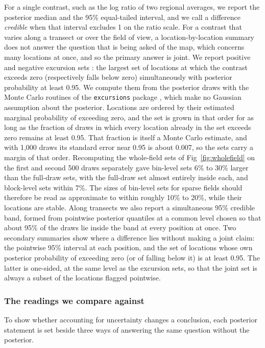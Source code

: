 \documentclass[10pt,letterpaper]{article}
\begin{document}
For a single contrast, such as the log ratio of two regional averages, we report the posterior median and the 95\% equal-tailed interval, and we call a difference \textit{credible} when that interval excludes 1 on the ratio scale. For a contrast that varies along a transect or over the field of view, a location-by-location summary does not answer the question that is being asked of the map, which concerns many locations at once, and so the primary answer is joint. We report positive and negative excursion sets \cite{bolin2015excursion}: the largest set of locations at which the contrast exceeds zero (respectively falls below zero) simultaneously with posterior probability at least 0.95. We compute them from the posterior draws with the Monte Carlo routines of the \texttt{excursions} package \cite{bolin2018excursions}, which make no Gaussian assumption about the posterior. Locations are ordered by their estimated marginal probability of exceeding zero, and the set is grown in that order for as long as the fraction of draws in which every location already in the set exceeds zero remains at least 0.95. That fraction is itself a Monte Carlo estimate, and with 1,000 draws its standard error near 0.95 is about 0.007, so the sets carry a margin of that order. Recomputing the whole-field sets of Fig~\ref{fig:wholefield} on the first and second 500 draws separately gave bin-level sets 6\% to 30\% larger than the full-draw sets, with the full-draw set almost entirely inside each, and block-level sets within 7\%. The sizes of bin-level sets for sparse fields should therefore be read as approximate to within roughly 10\% to 20\%, while their locations are stable. Along transects we also report a simultaneous 95\% credible band, formed from pointwise posterior quantiles at a common level chosen so that about 95\% of the draws lie inside the band at every position at once. Two secondary summaries show where a difference lies without making a joint claim: the pointwise 95\% interval at each position, and the set of locations whose own posterior probability of exceeding zero (or of falling below it) is at least 0.95. The latter is one-sided, at the same level as the excursion sets, so that the joint set is always a subset of the locations flagged pointwise.

\subsubsection*{The readings we compare against}

To show whether accounting for uncertainty changes a conclusion, each posterior statement is set beside three ways of answering the same question without the posterior.
\end{document}
